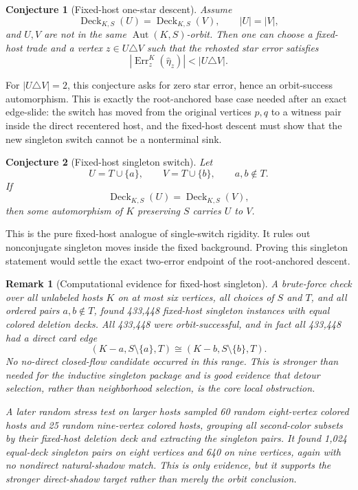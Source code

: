 \documentclass[11pt]{article}
\newtheorem{conjecture}{Conjecture}
\newtheorem{remark}{Remark}
\newcommand{\Deck}{\operatorname{Deck}}
\newcommand{\Aut}{\operatorname{Aut}}
\newcommand{\Err}{\operatorname{Err}}
\begin{document}
\begin{conjecture}[Fixed-host one-star descent]
Assume
\[
  \Deck_{K,S}(U)=\Deck_{K,S}(V),
  \qquad |U|=|V|,
\]
and \(U,V\) are not in the same \(\Aut(K,S)\)-orbit.  Then one can choose a
fixed-host trade and a vertex \(z\in U\triangle V\) such that the rehosted
star error satisfies
\[
  |\Err^K_z(\widehat\eta_z)| < |U\triangle V|.
\]
\end{conjecture}

For \(|U\triangle V|=2\), this conjecture asks for zero star error, hence an
orbit-success automorphism.  This is exactly the root-anchored base case
needed after an exact edge-slide: the switch has moved from the original
vertices \(p,q\) to a witness pair inside the direct recentered host, and the
fixed-host descent must show that the new singleton switch cannot be a
nonterminal sink.

\begin{conjecture}[Fixed-host singleton switch]
Let
\[
  U=T\cup\{a\},
  \qquad
  V=T\cup\{b\},
  \qquad
  a,b\notin T.
\]
If
\[
  \Deck_{K,S}(U)=\Deck_{K,S}(V),
\]
then some automorphism of \(K\) preserving \(S\) carries \(U\) to \(V\).
\end{conjecture}

This is the pure fixed-host analogue of single-switch rigidity.  It rules out
nonconjugate singleton moves inside the fixed background.  Proving this
singleton statement would settle the exact two-error endpoint of the
root-anchored descent.

\begin{remark}[Computational evidence for fixed-host singleton]
A brute-force check over all unlabeled hosts \(K\) on at most six vertices,
all choices of \(S\) and \(T\), and all ordered pairs \(a,b\notin T\), found
433,448 fixed-host singleton instances with equal colored deletion decks.  All
433,448 were orbit-successful, and in fact all 433,448 had a direct card edge
\[
  (K-a,S\setminus\{a\},T)
  \cong
  (K-b,S\setminus\{b\},T).
\]
No no-direct closed-flow candidate occurred in this range.  This is stronger
than needed for the inductive singleton package and is good evidence that
detour selection, rather than neighborhood selection, is the core local
obstruction.

A later random stress test on larger hosts sampled 60 random eight-vertex
colored hosts and 25 random nine-vertex colored hosts, grouping all
second-color subsets by their fixed-host deletion deck and extracting the
singleton pairs.  It found 1,024 equal-deck singleton pairs on eight vertices
and 640 on nine vertices, again with no nondirect natural-shadow match.  This
is only evidence, but it supports the stronger direct-shadow target rather
than merely the orbit conclusion.
\end{remark}
\end{document}
